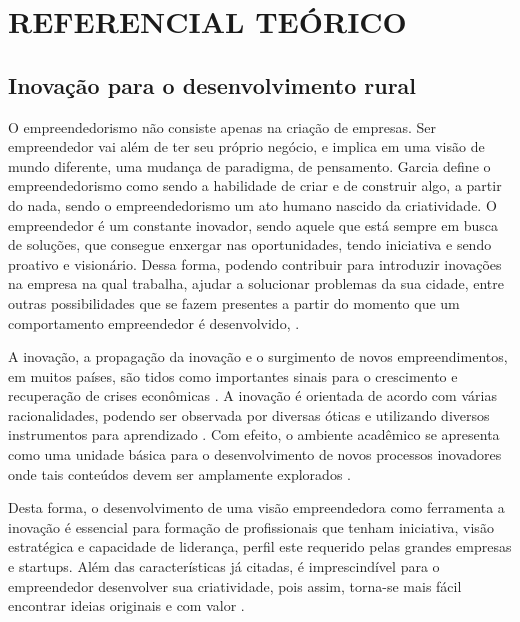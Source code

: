 \chapter{REFERENCIAL TEÓRICO}

\section{Inovação para o desenvolvimento rural}


O empreendedorismo não consiste apenas na criação de empresas. Ser empreendedor vai além de ter seu próprio negócio, e implica em uma visão de mundo diferente, uma mudança de paradigma, de pensamento. Garcia \cite{garcia_formacao_2000} define o empreendedorismo como sendo a habilidade de criar e de construir algo, a partir do nada, sendo o empreendedorismo um ato humano nascido da criatividade. O empreendedor é um constante inovador, sendo aquele que está sempre em busca de soluções, que consegue enxergar nas oportunidades, tendo iniciativa e sendo proativo e visionário. Dessa forma, podendo contribuir para introduzir inovações na empresa na qual trabalha, ajudar a solucionar problemas da sua cidade, entre outras possibilidades que se fazem presentes a partir do momento que um comportamento empreendedor é desenvolvido, \cite{alencar_intencao_2019, loiola_cao_2016}.

A inovação, a propagação da inovação e o surgimento de novos empreendimentos, em muitos países, são tidos como importantes sinais para o crescimento e recuperação de crises econômicas \cite{silva_educacao_2017}. A inovação é orientada de acordo com várias racionalidades, podendo ser observada por diversas óticas e utilizando diversos instrumentos para aprendizado \cite{munoz_innovacion_2016}. Com efeito, o ambiente acadêmico se apresenta como uma unidade básica para o desenvolvimento de novos processos inovadores onde tais conteúdos devem ser amplamente explorados \cite{costa_inovacao_2017}. 

Desta forma, o desenvolvimento de uma visão empreendedora como ferramenta a inovação é essencial para formação de profissionais que tenham iniciativa, visão estratégica e capacidade de liderança, perfil este requerido pelas grandes empresas e startups. Além das características já citadas, é imprescindível para o empreendedor desenvolver sua criatividade, pois assim, torna-se mais fácil encontrar ideias originais e com valor \cite{macedo_capital_2019}  . 

